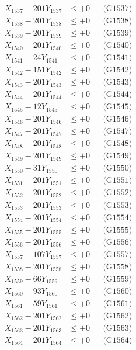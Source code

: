 \documentclass[a4paper,10pt]{article}
\begin{document}
{\begin{align}
X_{1537} - 201Y_{1537} &\leq +0 && \text{(G1537)} \\
X_{1538} - 201Y_{1538} &\leq +0 && \text{(G1538)} \\
X_{1539} - 201Y_{1539} &\leq +0 && \text{(G1539)} \\
X_{1540} - 201Y_{1540} &\leq +0 && \text{(G1540)} \\
\allowbreak
X_{1541} - 24Y_{1541} &\leq +0 && \text{(G1541)} \\
X_{1542} - 151Y_{1542} &\leq +0 && \text{(G1542)} \\
X_{1543} - 201Y_{1543} &\leq +0 && \text{(G1543)} \\
X_{1544} - 201Y_{1544} &\leq +0 && \text{(G1544)} \\
X_{1545} - 12Y_{1545} &\leq +0 && \text{(G1545)} \\
X_{1546} - 201Y_{1546} &\leq +0 && \text{(G1546)} \\
X_{1547} - 201Y_{1547} &\leq +0 && \text{(G1547)} \\
X_{1548} - 201Y_{1548} &\leq +0 && \text{(G1548)} \\
X_{1549} - 201Y_{1549} &\leq +0 && \text{(G1549)} \\
X_{1550} - 31Y_{1550} &\leq +0 && \text{(G1550)} \\
\allowbreak
X_{1551} - 201Y_{1551} &\leq +0 && \text{(G1551)} \\
X_{1552} - 201Y_{1552} &\leq +0 && \text{(G1552)} \\
X_{1553} - 201Y_{1553} &\leq +0 && \text{(G1553)} \\
X_{1554} - 201Y_{1554} &\leq +0 && \text{(G1554)} \\
X_{1555} - 201Y_{1555} &\leq +0 && \text{(G1555)} \\
X_{1556} - 201Y_{1556} &\leq +0 && \text{(G1556)} \\
X_{1557} - 107Y_{1557} &\leq +0 && \text{(G1557)} \\
X_{1558} - 201Y_{1558} &\leq +0 && \text{(G1558)} \\
X_{1559} - 66Y_{1559} &\leq +0 && \text{(G1559)} \\
X_{1560} - 93Y_{1560} &\leq +0 && \text{(G1560)} \\
\allowbreak
X_{1561} - 59Y_{1561} &\leq +0 && \text{(G1561)} \\
X_{1562} - 201Y_{1562} &\leq +0 && \text{(G1562)} \\
X_{1563} - 201Y_{1563} &\leq +0 && \text{(G1563)} \\
X_{1564} - 201Y_{1564} &\leq +0 && \text{(G1564)} \\

\end{align}}
\end{document}
